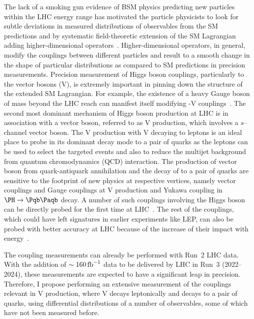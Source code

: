 \documentclass[a4paper,11pt]{article}
\newcommand{\Pb}{{{\Pqb}}\xspace}
\newcommand{\PAb}{{{{\Paqb}}}\xspace}
\renewcommand{\PV}{{{{V}}}\xspace}
\newcommand{\VH}{{{\PV}{\PH}}\xspace}
\begin{document}
The lack of a smoking gun evidence of BSM physics predicting new particles within the LHC energy range has motivated the particle physicists to look for subtle deviations in measured distributions of observables from the SM predictions and by systematic field-theoretic extension of the SM Lagrangian adding higher-dimensional operators~\cite{Grinstein:1991cd,Chiu:2007dg,Passarino:2016pzb}.
Higher-dimensional operators, in general, modify the couplings between different particles and result to a smooth change in the shape of particular distributions as compared to SM predictions in precision measurements. 
Precision measurement of Higgs boson couplings, particularly to the vector bosons (\PV), is extremely important in pinning down the structure of the extended SM Lagrangian. 
For example, the existence of a heavy Gauge boson of mass beyond the LHC reach can manifest itself modifying {\PH}-{\PV} couplings~\cite{Appelquist:1974tg}. 
The second most dominant mechanism of Higgs boson production at LHC is in association with a vector boson, referred to as \VH production, which involves a $s$--channel vector boson. 
The \VH production with \PV decaying to leptons is an ideal place to probe \PH in its dominant decay mode to a pair of \Pb quarks as the leptons can be used to select the targeted events and also to reduce the multijet background from quantum chromodynamics (QCD) interaction.
The production of vector boson from quark-antiquark annihilation and the decay of \PH to a pair of \Pb quarks are sensitive to the footprint of new physics at respective vertices, namely vector couplings and Gauge couplings at \VH production and Yukawa coupling in $\PH \to \Pb \PAb$ decay. 
A number of such couplings involving the Higgs boson can be directly probed for the first time at LHC~\cite{Gupta:2014rxa}.
The rest of the couplings, which could have left signatures in earlier experiments like LEP, can also be probed with better accuracy at LHC because of the increase of their impact with energy~\cite{Ellis:2014jta,Grojean:2018dqj}.


The coupling measurements can already be performed with Run~2 LHC data. With the addition of $\sim 160\mbox{\ensuremath{\,\text{fb}^{-1}}}$ data to be delivered by LHC in Run~3 (2022--2024), these measurements are expected to have a significant leap in precision.
Therefore, I propose performing an extensive measurement of the couplings relevant in \VH production, where \PV decays leptonically and \PH decays to a pair of \Pb quarks, using differential distributions of a number of observables, some of which have not been measured before.
\end{document}
